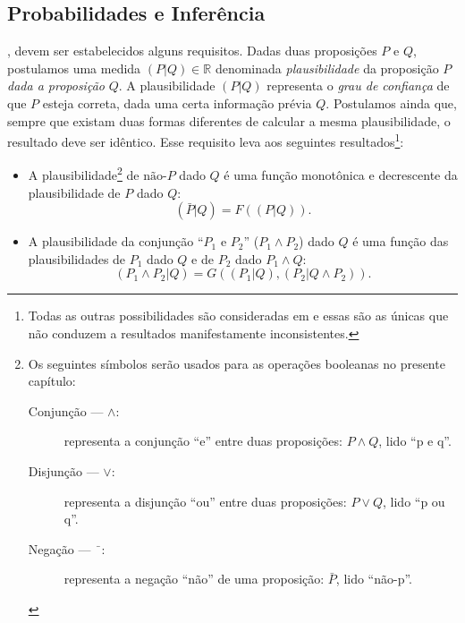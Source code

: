 \subsection{Probabilidades e Inferência}
\label{sec:probabilidadeseinferencia}
, devem ser estabelecidos alguns requisitos. Dadas duas proposições $P$ e $Q$, postulamos uma medida $(P | Q) \in \mathbb{R}$ denominada \emph{plausibilidade}\cite[-6cm]{Goyal2010} da proposição $P$ \emph{dada a proposição} $Q$. A plausibilidade $(P|Q)$ representa o \emph{grau de confiança} de que $P$ esteja correta, dada uma certa informação prévia $Q$. Postulamos ainda que, sempre que existam duas formas diferentes de calcular a mesma plausibilidade, o resultado deve ser idêntico. Esse requisito leva aos seguintes resultados\footnote[][-6cm]{Todas as outras possibilidades são consideradas em \citet{Tribus1969} e essas são as únicas que não conduzem a resultados manifestamente inconsistentes.}\cite{Tribus1969}:
\begin{itemize}
\item A plausibilidade\footnote[][]{Os seguintes símbolos serão usados para as operações booleanas no presente capítulo:
\begin{description}
 \item[Conjunção --- $\wedge$:] representa a conjunção ``e'' entre duas proposições: $P\wedge Q$, lido ``p e q''.
 \item[Disjunção --- $\vee$:] representa a disjunção ``ou'' entre duas proposições: $P\vee Q$, lido ``p ou q''.
 \item[Negação --- $\bar{\phantom{a}}$:] representa a negação ``não'' de uma proposição: $\bar{P}$, lido ``não-p''.
\end{description}
} de $\text{não-}P$ dado $Q$ é uma função monotônica e decrescente da plausibilidade de $P$ dado $Q$: 
\[
 (\bar{P}|Q) = F(({P}|Q)).
\]
\item A plausibilidade da conjunção ``$P_1$ e $P_2$'' ($P_1\wedge P_2$) dado $Q$ é uma função das plausibilidades de $P_1$ dado $Q$ e de $P_2$ dado $P_1\wedge Q$:
\[
 (P_1\wedge P_2|Q) = G((P_1|Q), (P_2|Q\wedge P_2)).
\]
\end{itemize}

